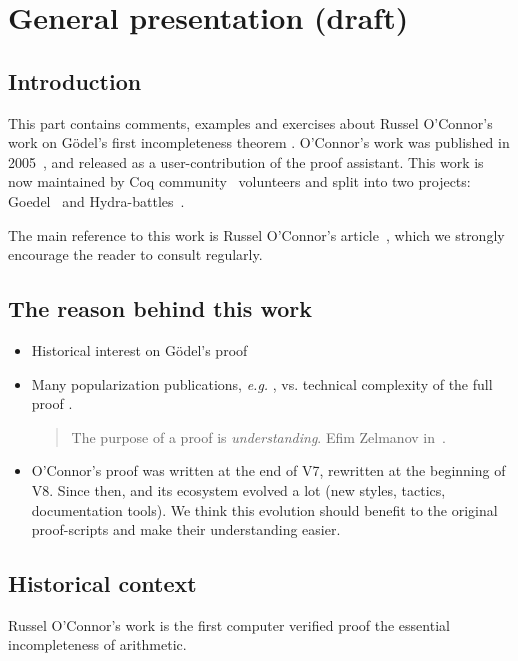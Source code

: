 \chapter{General presentation (draft)}

\section{Introduction}


This part contains comments, examples  and exercises about Russel O'Connor's work on G\"{o}del's first incompleteness theorem  \cite{Godel1986-GDECW}.
O'Connor's work was published in 2005~\cite{OConnor05}, and released as a user-contribution of the \coq proof assistant.
This work is now maintained by Coq community~\cite{CoqCommunity} volunteers and split into two projects: Goedel~\cite{Goedel} and Hydra-battles~\cite{HydraBattles}.

The main reference to this work is  Russel O'Connor's article~\cite{OConnor05}, which we strongly encourage the reader to 
consult regularly. 



\section{The reason behind this work}


  \begin{itemize}
  \item Historical interest on G\"{o}del's proof
  \item Many popularization publications, \emph{e.g.}
    \cite{smullyan1992godel, Hofstadter1999Godel, GoedelCassou}, vs. technical complexity of the full proof .
    
    \begin{quote}
      The purpose of a proof is \emph{understanding}.
      Efim Zelmanov in~\cite{mathproof}.  
          \end{quote}
        \item O'Connor's proof was written at the end of \coq V7, rewritten at the beginning of \coq V8. Since then, \coq and its ecosystem evolved a lot (new styles, tactics, documentation tools).
          We think this evolution should benefit
          to the original proof-scripts and make their understanding easier.
        \end{itemize}
     


\section{Historical context}
Russel O'Connor's work is the first computer verified proof 
the essential incompleteness of arithmetic.

